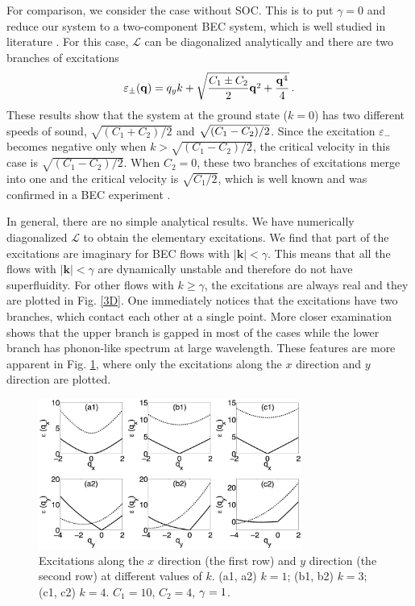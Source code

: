 \documentclass[doublecol]{epl2}
\begin{document}
For comparison, we consider the case without SOC. This is to put $\gamma =0$
and reduce our system to a two-component BEC system, which is well studied
in literature \cite{pu2}. For this case, $\mathcal{L}$ can be diagonalized
analytically and there are two branches of excitations
\begin{equation}
\varepsilon _{\pm }({\mathbf{q}})=q_{y}k+\sqrt{\frac{C_{1}\pm C_{2}}{2}{%
\mathbf{q}}^{2}+\frac{{\mathbf{q}}^{4}}{4}}\,.
\end{equation}%
These results show that the system at the ground state ($k=0$) has two
different speeds of sound, $\sqrt{(C_{1}+C_{2})/2}$ and $\sqrt{%
(C_{1}-C_{2})/2}$. Since the excitation $\varepsilon _{-}$ becomes negative
only when $k>\sqrt{(C_{1}-C_{2})/2}$, the critical velocity in this case is $%
\sqrt{(C_{1}-C_{2})/2}$. When $C_2=0$, these two branches of excitations
merge into one and the critical velocity is $\sqrt{C_{1}/2}$, which is well
known and was confirmed in a BEC experiment \cite{raman}.

In general, there are no simple analytical results. We have numerically
diagonalized $\mathcal{L}$ to obtain the elementary excitations. We find
that part of the excitations are imaginary for BEC flows with $|{\mathbf{k}}%
|<\gamma$. This means that all the flows with $|{\mathbf{k}}|<\gamma$ are
dynamically unstable and therefore do not have superfluidity. For other
flows with $k\ge \gamma$, the excitations are always real and they are
plotted in Fig. \ref{3D}. One immediately notices that the excitations have
two branches, which contact each other at a single point. More closer
examination shows that the upper branch is gapped in most of the cases while
the lower branch has phonon-like spectrum at large wavelength. These
features are more apparent in Fig. \ref{xy}, where only the excitations
along the $x$ direction and $y$ direction are plotted.

\begin{figure}[!htb]
\includegraphics[width=3.4in]{fig3.eps}\newline
\caption{Excitations along the $x$ direction (the first row) and $y$
direction (the second row) at different values of $k$. (a1, a2) $k=1$; (b1,
b2) $k=3$; (c1, c2) $k=4$. $C_1=10$, $C_2=4$, $\protect\gamma=1$.}
\label{xy}
\end{figure}
\end{document}
